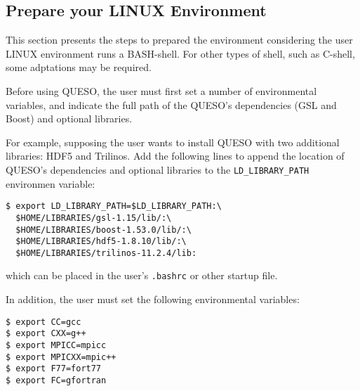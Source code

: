 


\subsection{Prepare your LINUX Environment}\label{sec:prepare}


This section presents the steps to prepared the environment
considering the user LINUX environment runs a BASH-shell. For other types of shell, such as C-shell, some adptations may be required.

Before using QUESO, the user must first set a number of environmental variables, and indicate the full path
of the QUESO's dependencies (GSL and Boost) and optional libraries. 

For example, supposing the user wants to install QUESO with two additional libraries: HDF5 and Trilinos. 
Add the following lines to append the location of QUESO's dependencies and optional libraries to the \verb+LD_LIBRARY_PATH+ environmen variable:
%
\begin{lstlisting}
$ export LD_LIBRARY_PATH=$LD_LIBRARY_PATH:\
  $HOME/LIBRARIES/gsl-1.15/lib/:\
  $HOME/LIBRARIES/boost-1.53.0/lib/:\
  $HOME/LIBRARIES/hdf5-1.8.10/lib/:\
  $HOME/LIBRARIES/trilinos-11.2.4/lib:
\end{lstlisting}
which can be placed in the user's \verb+.bashrc+ or other startup file. 

In addition, the user must set the following environmental
variables:
\begin{lstlisting}
$ export CC=gcc
$ export CXX=g++
$ export MPICC=mpicc
$ export MPICXX=mpic++
$ export F77=fort77
$ export FC=gfortran
\end{lstlisting}



